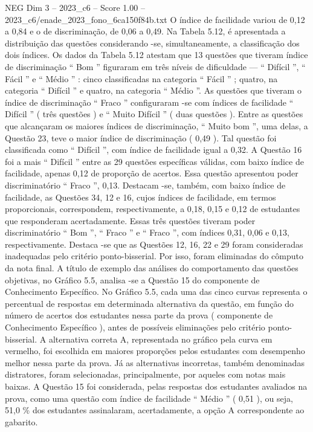 \begin{textsample}{NEG Dim 3 – 2023\_c6 – Score 1.00 – 2023\_c6/enade\_2023\_fono\_6ca150f84b.txt}
O índice de facilidade variou de 0,12 a 0,84 e o de discriminação, de 0,06 a 0,49.
Na Tabela 5.12, é apresentada a distribuição das questões considerando -se, simultaneamente, a classificação dos dois índices.
Os dados da Tabela 5.12 atestam que 13 questões que tiveram índice de discriminação “ Bom ” figuraram em três níveis de dificuldade — “ Difícil ”, “ Fácil ” e “ Médio ” : cinco classificadas na categoria “ Fácil ” ; quatro, na categoria “ Difícil ” e quatro, na categoria “ Médio ”.
As questões que tiveram o índice de discriminação “ Fraco ” configuraram -se com índices de facilidade “ Difícil ” ( três questões ) e “ Muito Difícil ” ( duas questões ).
Entre as questões que alcançaram os maiores índices de discriminação, “ Muito bom ”, uma delas, a Questão 23, teve o maior índice de discriminação ( 0,49 ).
Tal questão foi classificada como “ Difícil ”, com índice de facilidade igual a 0,32.
A Questão 16 foi a mais “ Difícil ” entre as 29 questões específicas válidas, com baixo índice de facilidade, apenas 0,12 de proporção de acertos.
Essa questão apresentou poder discriminatório “ Fraco ”, 0,13.
Destacam -se, também, com baixo índice de facilidade, as Questões 34, 12 e 16, cujos índices de facilidade, em termos proporcionais, correspondem, respectivamente, a 0,18, 0,15 e 0,12 de estudantes que responderam acertadamente.
Essas três questões tiveram poder discriminatório “ Bom ”, “ Fraco ” e “ Fraco ”, com índices 0,31, 0,06 e 0,13, respectivamente.
Destaca -se que as Questões 12, 16, 22 e 29 foram consideradas inadequadas pelo critério ponto-bisserial.
Por isso, foram eliminadas do cômputo da nota final.
A título de exemplo das análises do comportamento das questões objetivas, no Gráfico 5.5, analisa -se a Questão 15 do componente de Conhecimento Específico.
No Gráfico 5.5, cada uma das cinco curvas representa o percentual de respostas em determinada alternativa da questão, em função do número de acertos dos estudantes nessa parte da prova ( componente de Conhecimento Específico ), antes de possíveis eliminações pelo critério ponto-bisserial.
A alternativa correta A, representada no gráfico pela curva em vermelho, foi escolhida em maiores proporções pelos estudantes com desempenho melhor nessa parte da prova.
Já as alternativas incorretas, também denominadas distratores, foram selecionadas, principalmente, por aqueles com notas mais baixas.
A Questão 15 foi considerada, pelas respostas dos estudantes avaliados na prova, como uma questão com índice de facilidade “ Médio ” ( 0,51 ), ou seja, 51,0 \% dos estudantes assinalaram, acertadamente, a opção A correspondente ao gabarito.

\end{textsample}
